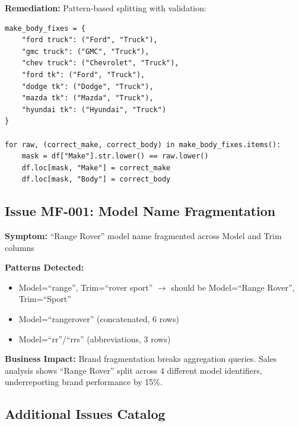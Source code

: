 \documentclass[12pt,a4paper]{article}
\begin{document}
\textbf{Remediation:} Pattern-based splitting with validation:
\begin{lstlisting}
make_body_fixes = {
    "ford truck": ("Ford", "Truck"),
    "gmc truck": ("GMC", "Truck"),
    "chev truck": ("Chevrolet", "Truck"),
    "ford tk": ("Ford", "Truck"),
    "dodge tk": ("Dodge", "Truck"),
    "mazda tk": ("Mazda", "Truck"),
    "hyundai tk": ("Hyundai", "Truck")
}

for raw, (correct_make, correct_body) in make_body_fixes.items():
    mask = df["Make"].str.lower() == raw.lower()
    df.loc[mask, "Make"] = correct_make
    df.loc[mask, "Body"] = correct_body
\end{lstlisting}

\subsection{Issue MF-001: Model Name Fragmentation}

\begin{warningbox}
\textbf{Symptom:} ``Range Rover'' model name fragmented across Model and Trim columns

\textbf{Patterns Detected:}
\begin{itemize}
    \item Model=``range'', Trim=``rover sport'' $\rightarrow$ should be Model=``Range Rover'', Trim=``Sport''
    \item Model=``rangerover'' (concatenated, 6 rows)
    \item Model=``rr''/``rrs'' (abbreviations, 3 rows)
\end{itemize}

\textbf{Business Impact:} Brand fragmentation breaks aggregation queries. Sales analysis shows ``Range Rover'' split across 4 different model identifiers, underreporting brand performance by 15\%.
\end{warningbox}

\subsection{Additional Issues Catalog}
\end{document}
